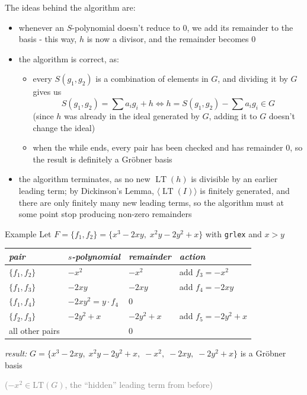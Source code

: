 \documentclass[a4paper, 11pt]{report}
\newcommand{\gen}[1]{\langle #1 \rangle}
\newcommand{\LT}{\operatorname{LT}}
\begin{document}
The ideas behind the algorithm are:
\begin{itemize}
    \item whenever an $S$-polynomial doesn't reduce to $0$, we add its remainder to the basis - this way, $h$ is now a divisor, and the remainder becomes $0$
    \item the algorithm is correct, as:
        \begin{itemize}
            \item every $S(g_1, g_2)$ is a combination of elements in $G$, and dividing it by $G$ gives us
                $$ S(g_1,g_2) = \sum a_{i} g_{i} +h \iff h = S(g_1, g_2) - \sum a_{i} g_{i} \in G $$ (since $h$ was already in the ideal generated by $G$, adding it to $G$ doesn't change the ideal)
            \item when the while ends, every pair has been checked and has remainder $0$, so the result is definitely a Gr\"obner basis
        \end{itemize}
    \item the algorithm terminates, as no new $\LT(h)$ is divisible by an earlier leading term; by Dickinson's Lemma, $\gen{\LT(I)}$ is finitely generated, and there are only finitely many new leading terms, so the algorithm must at some point stop producing non-zero remainders
\end{itemize}

\begin{gframe}{Example}
Let $F = \{f_1, f_2\} = \{x^3 - 2xy,\; x^2y - 2y^2 + x\}$ with \texttt{grlex} and $x > y$

\begin{center}
\renewcommand{\arraystretch}{1.3}
\begin{tabular}{llll}
\hline
\textit{pair} & \textit{$s$-polynomial} & \textit{remainder} & \textit{action} \\
\hline
$\{f_1, f_2\}$ & $-x^2$ & $-x^2$ & add $f_3 = -x^2$ \\
$\{f_1, f_3\}$ & $-2xy$ & $-2xy$ & add $f_4 = -2xy$ \\
$\{f_1, f_4\}$ & $-2xy^2 = y \cdot f_4$ & $0$ & \\
$\{f_2, f_3\}$ & $-2y^2 + x$ & $-2y^2 + x$ & add $f_5 = -2y^2 + x$ \\
all other pairs & & $0$ & \\
\hline
\end{tabular}
\end{center}

\noindent\textit{result:} $G = \{x^3 - 2xy,\; x^2y - 2y^2 + x,\; -x^2,\; -2xy,\; -2y^2 + x\}$ is a Gröbner basis

\noindent \textcolor{gray}{($-x^2 \in \text{LT}(G)$, the ``hidden'' leading term from before)}

\end{gframe}
\end{document}
